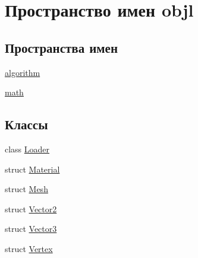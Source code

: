 \hypertarget{namespaceobjl}{}\section{Пространство имен objl}
\label{namespaceobjl}
\subsection*{Пространства имен}
\begin{DoxyCompactItemize}
\item 
 \hyperlink{namespaceobjl_1_1algorithm}{algorithm}
\item 
 \hyperlink{namespaceobjl_1_1math}{math}
\end{DoxyCompactItemize}
\subsection*{Классы}
\begin{DoxyCompactItemize}
\item 
class \hyperlink{classobjl_1_1_loader}{Loader}
\item 
struct \hyperlink{structobjl_1_1_material}{Material}
\item 
struct \hyperlink{structobjl_1_1_mesh}{Mesh}
\item 
struct \hyperlink{structobjl_1_1_vector2}{Vector2}
\item 
struct \hyperlink{structobjl_1_1_vector3}{Vector3}
\item 
struct \hyperlink{structobjl_1_1_vertex}{Vertex}
\end{DoxyCompactItemize}
